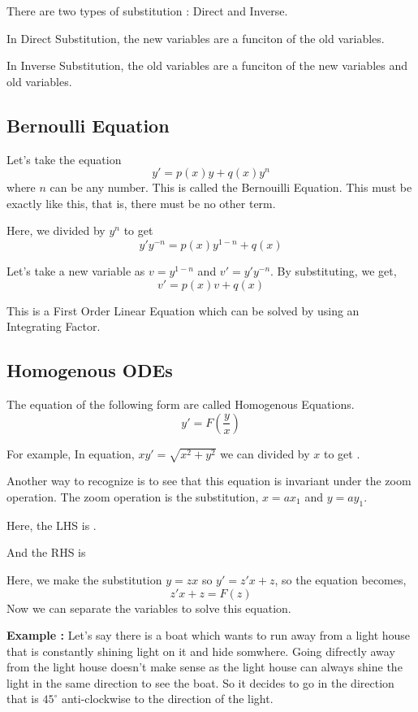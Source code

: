 There are two types of substitution : Direct and Inverse.

In Direct Substitution, the new variables are a funciton of the old variables.

In Inverse Substitution, the old variables are a funciton of the new variables and old variables.

\subsection{Bernoulli Equation}

Let's take the equation $$ y' = p(x) y + q(x) y^n $$ where $n$ can be any number.
This is called the Bernouilli Equation.
This must be exactly like this, that is, there must be no other term.

Here, we divided by $y^n$ to get $$ y' y^{-n} = p(x)y^{1-n} + q(x) $$

Let's take a new variable as $ v = y^{1-n} $ and  $ v' = y' y^{-n} $.
By substituting, we get, $$ v' = p(x) v + q(x) $$

This is a First Order Linear Equation which can be solved by using an Integrating Factor.

\subsection{Homogenous ODEs}

The equation of the following form are called Homogenous Equations.
$$ y' = F \left( \frac{y}{x} \right) $$

For example, In equation, $ xy' = \sqrt{x^2 + y^2} $ we can divided by $x$ to get .

Another way to recognize is to see that this equation is invariant under the zoom operation.
The zoom operation is the substitution, $x = ax_1$ and $y = ay_1$.

Here, the LHS is . 

And the RHS is  

Here, we make the substitution $y = zx$ so $y' = z'x + z$, so the equation becomes,
$$ z'x + z = F(z) $$ 
Now we can separate the variables to solve this equation.

{\bf Example : } Let's say there is a boat which wants to run away from a light house that is constantly shining light on it and hide somwhere.
Going difrectly away from the light house doesn't make sense as the light house can always shine the light in the same direction to see the boat.
So it decides to go in the direction that is $45^{\circ}$ anti-clockwise to the direction of the light.

